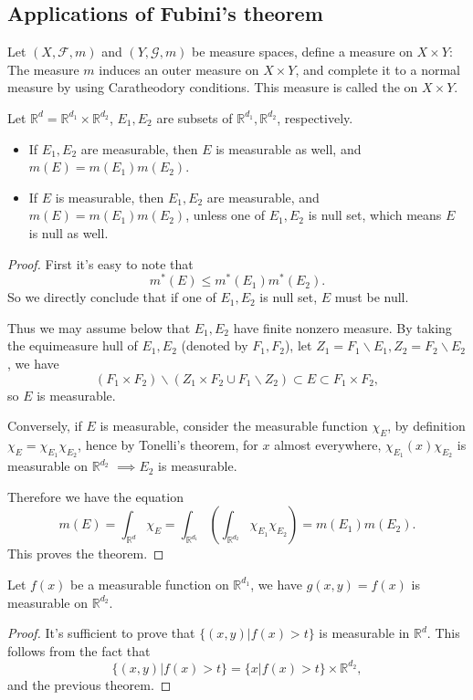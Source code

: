 \subsection{Applications of Fubini's theorem}
\label{sub:Applications of Fubini's theorem}

\begin{definition}
	Let $(X, \mathscr{F}, m)$ and $(Y, \mathscr{G}, m)$ be
	measure spaces, define a measure on $X\times Y$:
	The measure $m$ induces an outer measure on  $X\times Y$,
	and complete it to a normal measure by using
	Caratheodory conditions. This measure is called
	the  on $X\times Y$.
\end{definition}

\begin{theorem}
	Let $ \mathbb{R}^d = \mathbb{R}^{d_1}\times \mathbb{R}^{d_2}$,
	$E_1,E_2$ are subsets of $\mathbb{R}^{d_1}, \mathbb{R}^{d_2}$,
	respectively.
	\begin{itemize}
		\item If $ E_1,E_2$ are measurable, then $E$ is measurable as well,
			and $m(E) = m(E_1)m(E_2)$.
		\item If $E$ is measurable, then  $E_1,E_2$ are measurable,
			and $m(E)=m(E_1)m(E_2)$, unless one of $E_1,E_2$ is null set,
			which means $E$ is null as well.
	\end{itemize}
\end{theorem}
\begin{proof}[Proof]
    First it's easy to note that
	\[
	m^*(E)\le m^*(E_1)m^*(E_2).
	\]
	So we directly conclude that if one of $E_1,E_2$ is null set, $E$ must be null.

	Thus we may assume below that $E_1,E_2$ have finite nonzero measure.
	By taking the equimeasure hull of $E_1,E_2$ (denoted by $F_1,F_2$),
	let $Z_1=F_1 \backslash E_1, Z_2=F_2\backslash E_2$, we have
	\[
		(F_1\times F_2)\backslash(Z_1\times F_2\cup F_1\backslash Z_2)\subset
		E \subset F_1\times F_2,
	\]
	so $E$ is measurable.

	Conversely, if  $E$ is measurable, consider the measurable function $\chi_E$,
	by definition  $\chi_E = \chi_{E_1}\chi_{E_2}$, hence by Tonelli's theorem,
	for $x$ almost everywhere, $\chi_{E_1}(x)\chi_{E_2}$ is measurable
	on $\mathbb{R}^{d_2}$ $ \implies E_2$ is measurable.

	Therefore we have the equation
	\[
	m(E) = \int_{\mathbb{R}^d} \chi_E
	= \int_{\mathbb{R}^{d_1}} \left( \int_{\mathbb{R}^{d_2}} \chi_{E_1}\chi_{E_2} \right)
	= m(E_1)m(E_2).
	\]
	This proves the theorem.
\end{proof}
\begin{corollary}
    Let $f(x)$ be a measurable function on  $\mathbb{R}^{d_1}$,
	we have $g(x,y)=f(x)$ is measurable on  $\mathbb{R}^{d_2}$.
\end{corollary}
\begin{proof}[Proof]
    It's sufficient to prove that $\{(x,y)|f(x)>t\}$ is measurable in $\mathbb{R}^{d}$.
	This follows from the fact that
	\[
	\{(x,y)| f(x)>t\} = \{x|f(x)>t\}\times \mathbb{R}^{d_2},
	\]
	and the previous theorem.
\end{proof}

